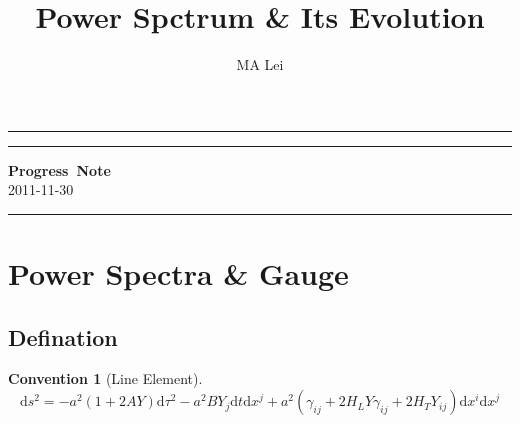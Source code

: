 \documentclass{article}
\begin{document}
\title{Power Spctrum \& Its Evolution}
\author{MA Lei}
\maketitle



\hrule\vspace{1pt}\hrule
\begin{center}
\mbox{{\bf Progress Note}} \\
\vspace{0.5em}
\mbox{2011-11-30}
\end{center}
\hrule


\section{Power Spectra \& Gauge}
\newtheorem{defination}{Defination}[section]
\newtheorem{convention}{Convention}[section]

\subsection{Defination}

\begin{convention}[Line Element]
$$\mathrm ds^2=-a^2(1+2AY)\mathrm d\tau^2-a^2BY_j\mathrm dt\mathrm dx^j+a^2(\gamma_{ij}+2H_LY\gamma_{ij}+2H_TY_{ij})\mathrm dx^i\mathrm dx^j$$
\end{convention}

\end{document}
